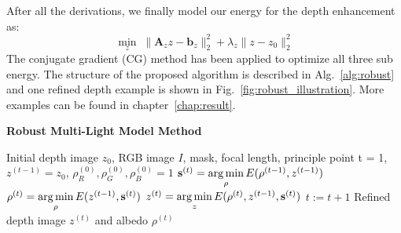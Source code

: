 After all the derivations, we finally model our energy for the depth enhancement as:
 \begin{equation}\label{eq:robust_depth_estimate}
    \min_{z} \; \lVert  \mathbf{A}_{z}z - \mathbf{b}_z\rVert^2_2 + \lambda_{z}\lVert z - z_0 \rVert_2^2
\end{equation}
The conjugate gradient (CG) method has been applied to optimize all three sub energy.
The structure of the proposed algorithm is described in Alg.~\ref{alg:robust} and one refined depth example is shown in Fig.~\ref{fig:robust_illustration}.
More examples can be found in chapter~\ref{chap:result}.

\begin{algorithm}[!htbp]
    \begin{algorithmic}[1] 
          \caption{\textbf{Robust Multi-Light Model Method}}
        \label{alg:robust}
         \renewcommand{\algorithmicrequire}{\textbf{Input:}}
         \renewcommand{\algorithmicensure}{\textbf{Output:}}
         \REQUIRE Initial depth image $z_0$, RGB image $I$, mask, focal length, principle point
         \vspace{1.8mm}
         \STATE t = 1, $z^{(t-1)} = z_0$, $\rho^{(0)}_R, \rho^{(0)}_G, \rho^{(0)}_B = 1$
         \vspace{1.8mm}
               \vspace{1.8mm}
                \STATE $\mathbf{s}^{(t)} = \operatorname*{arg\,min} \limits_{\rho} E(\rho^{(t-1)}, z^{(t-1)})$ 
            \STATE $\rho^{(t)} = \operatorname*{arg\,min} \limits_{\rho} E(z^{(t-1)}, \mathbf{s}^{(t)})$ 
              \STATE $z^{(t)} = \operatorname*{arg\,min} \limits_{z} E(\rho^{(t)}, z^{(t-1)}, \mathbf{s}^{(t)})$ 
              \vspace{1.8mm}
                  \STATE $t := t + 1$
         \vspace{1.8mm}
          \ENDWHILE
          \ENSURE  Refined depth image $z^{(t)}$ and albedo $\rho^{(t)}$
    \end{algorithmic}
\end{algorithm}




